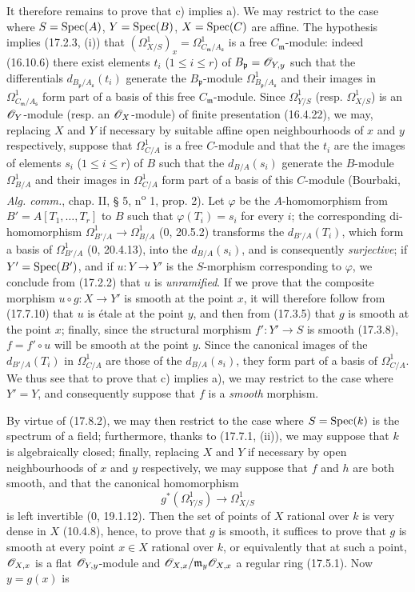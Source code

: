 
It therefore remains to prove that c) implies a). We may restrict to the case where $S=\operatorname{Spec}(A)$, $Y=\operatorname{Spec}(B)$, $X=\operatorname{Spec}(C)$ are affine. The hypothesis implies (17.2.3, (i)) that $(\Omega^1_{X/S})_x=\Omega^1_{C_{\mathfrak m}/A_{\mathfrak s}}$ is a free $C_{\mathfrak m}$-module: indeed (16.10.6) there exist elements $t_i$ ($1\leq i\leq r$) of $B_{\mathfrak p}=\mathscr{O}_{Y,y}$ such that the differentials $d_{B_{\mathfrak p}/A_{\mathfrak s}}(t_i)$ generate the $B_{\mathfrak p}$-module $\Omega^1_{B_{\mathfrak p}/A_{\mathfrak s}}$ and their images in $\Omega^1_{C_{\mathfrak m}/A_{\mathfrak s}}$ form part of a basis of this free $C_{\mathfrak m}$-module. Since $\Omega^1_{Y/S}$ (resp. $\Omega^1_{X/S}$) is an $\mathscr{O}_Y$-module (resp. an $\mathscr{O}_X$-module) of finite presentation (16.4.22), we may, replacing $X$ and $Y$ if necessary by suitable affine open neighbourhoods of $x$ and $y$ respectively, suppose that $\Omega^1_{C/A}$ is a free $C$-module and that the $t_i$ are the images of elements $s_i$ ($1\leq i\leq r$) of $B$ such that the $d_{B/A}(s_i)$ generate the $B$-module $\Omega^1_{B/A}$ and their images in $\Omega^1_{C/A}$ form part of a basis of this $C$-module (Bourbaki, \emph{Alg. comm.}, chap. II, § 5, n\textsuperscript{o} 1, prop. 2). Let $\varphi$ be the $A$-homomorphism from $B'=A[T_1,\ldots,T_r]$ to $B$ such that $\varphi(T_i)=s_i$ for every $i$; the corresponding di-homomorphism $\Omega^1_{B'/A}\to\Omega^1_{B/A}$ (0, 20.5.2) transforms the $d_{B'/A}(T_i)$, which form a basis of $\Omega^1_{B'/A}$ (0, 20.4.13), into the $d_{B/A}(s_i)$, and is consequently \emph{surjective}; if $Y'=\operatorname{Spec}(B')$, and if $u:Y\to Y'$ is the $S$-morphism corresponding to $\varphi$, we conclude from (17.2.2) that $u$ is \emph{unramified}. If we prove that the composite morphism $u\circ g:X\to Y'$ is smooth at the point $x$, it will therefore follow from (17.7.10) that $u$ is étale at the point $y$, and then from (17.3.5) that $g$ is smooth at the point $x$; finally, since the structural morphism $f':Y'\to S$ is smooth (17.3.8), $f=f'\circ u$ will be smooth at the point $y$. Since the canonical images of the $d_{B'/A}(T_i)$ in $\Omega^1_{C/A}$ are those of the $d_{B/A}(s_i)$, they form part of a basis of $\Omega^1_{C/A}$. We thus see that to prove that c) implies a), we may restrict to the case where $Y'=Y$, and consequently suppose that $f$ is a \emph{smooth} morphism.

By virtue of (17.8.2), we may then restrict to the case where $S=\operatorname{Spec}(k)$ is the spectrum of a field; furthermore, thanks to (17.7.1, (ii)), we may suppose that $k$ is algebraically closed; finally, replacing $X$ and $Y$ if necessary by open neighbourhoods of $x$ and $y$ respectively, we may suppose that $f$ and $h$ are both smooth, and that the canonical homomorphism
\[
g^*(\Omega^1_{Y/S})\to\Omega^1_{X/S}
\]
is left invertible (0, 19.1.12). Then the set of points of $X$ rational over $k$ is very dense in $X$ (10.4.8), hence, to prove that $g$ is smooth, it suffices to prove that $g$ is smooth at every point $x\in X$ rational over $k$, or equivalently that at such a point, $\mathscr{O}_{X,x}$ is a flat $\mathscr{O}_{Y,y}$-module and $\mathscr{O}_{X,x}/\mathfrak m_y\mathscr{O}_{X,x}$ a regular ring (17.5.1). Now $y=g(x)$ is

